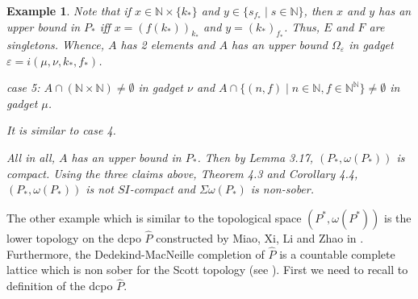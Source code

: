 \documentclass[preprint,12pt]{elsarticle}
\numberwithin{equation}{section}
\newtheorem{example}[theorem]{Example}
\begin{document}
\begin{example}
{Note that if $x\in\mathbb{N}\times\{k_{\ast}\}$ and $y\in\{s_{f_{\ast}}\mid s\in\mathbb{N}\}$, then $x$ and $y$ has an upper bound in $P_{\ast}$ iff $x=(f(k_{\ast}))_{k_{\ast}}$ and $y=(k_{\ast})_{f_{\ast}}$.
Thus, $E$ and $F$ are singletons. Whence, $A$ has 2 elements and $A$ has an upper bound $\Omega_{\varepsilon}$ in gadget $\varepsilon=i(\mu,\nu,k_{\ast},f_{\ast})$.

case 5: $A\cap(\mathbb{N}\times\mathbb{N})\neq\emptyset$ in gadget $\nu$ and $A\cap\{(n,f)\mid n\in\mathbb{N}, f\in\mathbb{N}^{\mathbb{N}}\}\neq\emptyset$ in gadget $\mu$.

It is similar to case 4.

All in all, $A$ has an upper bound in $P_{\ast}$. Then by Lemma 3.17, $(P_{\ast},\omega(P_{\ast}))$ is compact. Using the three claims above, Theorem 4.3 and Corollary 4.4, $(P_{\ast},\omega(P_{\ast}))$  is not $SI$-compact and $\Sigma \omega(P_{\ast})$ is non-sober.

}
\end{example}





\quad The other example which is similar to the topological space $(P^{\ast},\omega(P^{\ast}))$ is the lower topology on the dcpo $\widehat{P}$ constructed by Miao, Xi, Li and Zhao in \cite{AB75}. Furthermore, the Dedekind-MacNeille completion of $\widehat{P}$ is a countable complete lattice which is non sober for the Scott topology (see \cite{AB75}). First we need to recall to definition of the dcpo $\hat P$.
\end{document}
